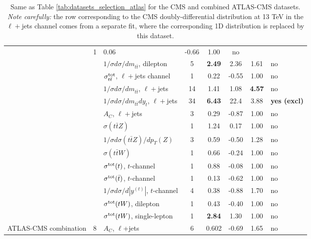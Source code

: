 \begin{table}[htbp]
{\begin{tabularx}{\textwidth}{ccXccccl}
  & 1
  & 0.06 
  & -0.66
  & 1.00
  & no \\
   & 
  & $1/\sigma d\sigma/dm_{t\bar{t}}$, dilepton  
  & 5
  & {\bf 2.49}
  & 2.36 
  & 1.61
  & no\\
   & 
  & $\sigma_{t\bar{t}}^{\rm tot}$, $\ell+$jets channel
  & 1
  & 0.22
  & -0.55
  & 1.00
  & no \\
   & 
  & $1/\sigma d\sigma/dm_{t\bar{t}}$, $\ell+$jets
  & 14
  & 1.41 
  & 1.08
  & {\bf 4.57}
  & no \\
   & 
  & $1/\sigma d\sigma/dm_{t\bar{t}}dy_{t}$, $\ell+$jets
  & 34
  & {\bf 6.43} 
  & 22.4
  & 3.88
  & {\bf yes (excl)} \\
  & 
  & $A_C$, $\ell+$jets
  & 3
  & 0.29
  & -0.87
  & 1.00
  & no \\
  & 
  & $\sigma(t\bar{t}Z)$
  & 1
  & 1.24
  & 0.17
  & 1.00
  &  no \\
  & 
  & $1/\sigma d\sigma(t\bar{t}Z)/dp_T(Z)$
  & 3
  & 0.59
  & -0.50
  & 1.28
  &  no\\
  & 
  & $\sigma(t\bar{t}W)$
  & 1
  & 0.66
  & -0.24
  & 1.00
  &  no \\
  & 
  & $\sigma^{\rm tot}(t)$, $t$-channel
  & 1
  & 0.88
  & -0.08
  & 1.00
  &  no \\
  & 
  & $\sigma^{\rm tot}(\bar{t})$, $t$-channel
  & 1
  & 0.13 
  & -0.62
  & 1.00
  &  no \\
  & 
  & $1/\sigma d\sigma/d|y^{(t)}|$, $t$-channel
  & 4
  & 0.38
  & -0.88
  & 1.70
  &  no \\
  & 
  & $\sigma^{\rm tot}(tW)$, dilepton
  & 1
  & 0.43  
  & -0.40
  & 1.00
  &  no \\
  & 
  & $\sigma^{\rm tot}(tW)$, single-lepton
  & 1
  & {\bf 2.84} 
  & 1.30
  & 1.00
  &  no \\
  \midrule
  ATLAS-CMS combination
  & 8
  & $A_C$, $\ell$+jets
  & 6
  & 0.602
  & -0.69
  & 1.65
  & no \\
  \bottomrule
   \end{tabularx}
   \vspace{0.3cm}
  \caption{\small Same as Table \ref{tab:datasets_selection_atlas} for the
    CMS and combined ATLAS-CMS datasets. \textit{Note carefully:} the row
    corresponding to the CMS doubly-differential distribution at 13 TeV in the $\ell+$jets
    channel comes from a separate fit, where the corresponding 1D distribution is replaced
    by this dataset.
   \label{tab:datasets_selection_cms}
}
}
\end{table}

